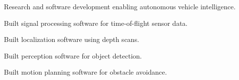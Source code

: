\begin{loneinnerlist}
\item Research and software development enabling autonomous vehicle intelligence.
\item Built signal processing software for time-of-flight sensor data.
\item Built localization software using depth scans.
\item Built perception software for object detection.
\item Built motion planning software for obstacle avoidance.
\end{loneinnerlist}
